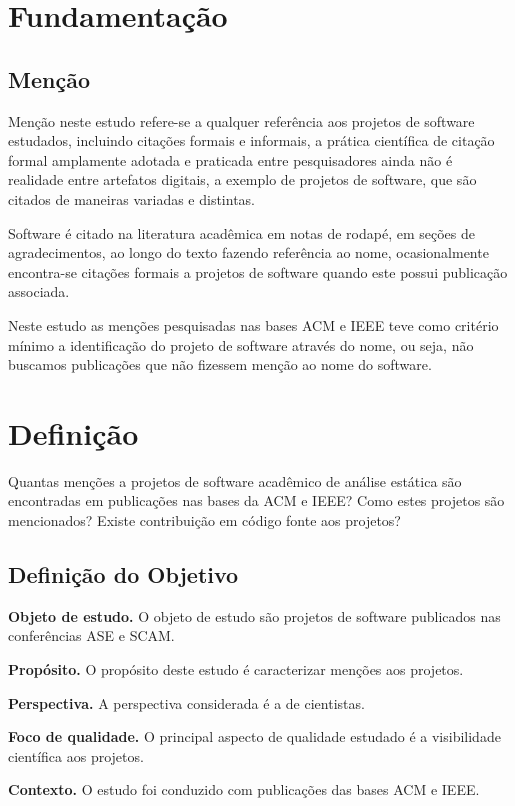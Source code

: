 
\section{Fundamentação} \label{estudo2:fundamentacao} %

\subsection{Menção}

Menção neste estudo refere-se a qualquer referência aos projetos de software
estudados, incluindo citações formais e informais, a prática científica de citação
formal amplamente adotada e praticada entre pesquisadores ainda não é realidade
entre artefatos digitais, a exemplo de projetos de software, que são citados
de maneiras variadas e distintas.

Software é citado na literatura acadêmica em notas de rodapé, em seções de
agradecimentos, ao longo do texto fazendo referência ao nome, ocasionalmente
encontra-se citações formais a projetos de software quando este possui
publicação associada.

Neste estudo as menções pesquisadas nas bases ACM e IEEE teve como critério
mínimo a identificação do projeto de software através do nome, ou seja, não
buscamos publicações que não fizessem menção ao nome do software.


\section{Definição} \label{estudo2:definicao} %

Quantas menções a projetos de software acadêmico de análise estática são
encontradas em publicações nas bases da ACM e IEEE? Como estes projetos são
mencionados? Existe contribuição em código fonte aos projetos?

\subsection{Definição do Objetivo}

\begin{description}
\item{\bf Objeto de estudo.} 
O objeto de estudo são projetos de software publicados nas conferências ASE e SCAM.

\item{\bf Propósito.} 
O propósito deste estudo é caracterizar menções aos projetos.

\item{\bf Perspectiva.} 
A perspectiva considerada é a de cientistas.

\item{\bf Foco de qualidade.} 
O principal aspecto de qualidade estudado é a visibilidade científica aos projetos.

\item{\bf Contexto.} 
O estudo foi conduzido com publicações das bases ACM e IEEE.
\end{description}


